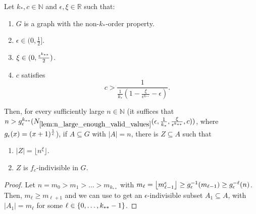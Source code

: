         \begin{lemma} \label{lem:many_values_to_equitative_partition_with_bound_exceptional_pairs}
            Let $k_*, c \in \mathbb{N}$ and $\epsilon, \xi \in \mathbb{R}$ such that:
            \begin{enumerate}
                \item\label{itm:many_values_to_equitative_partition_with_bound_exceptional_pairs.1} $G$ is a graph with the non-$k_*$-order property.
                \item\label{itm:many_values_to_equitative_partition_with_bound_exceptional_pairs.2} $\epsilon \in (0, \frac{1}{2}]$.
                \item\label{itm:many_values_to_equitative_partition_with_bound_exceptional_pairs.3} $\xi \in ( 0, \frac{\epsilon^{k_{**}}}{2} )$.
                \item\label{itm:many_values_to_equitative_partition_with_bound_exceptional_pairs.4} $c$ satisfies \[
                    c > \frac{1}{\frac{1}{k_*} (1 - \frac{\xi}{\epsilon^{k_{**}}} - \epsilon)}.
                \]
            \end{enumerate}
            Then, for every sufficiently large $n \in \mathbb{N}$ (it suffices that $n >
            g_\epsilon^{k_{**}}( N_{\ref{lem:n_large_enough_valid_values}}( \epsilon, \frac{1}{k_*}, \frac{\xi}{\epsilon^{k_{**}}}, c ) )$,
            where $g_\epsilon(x) = ( x+1 )^{\frac{1}{\epsilon}}$),
            if $A \subseteq G$ with $|A| = n$, there is $Z \subseteq A$ such that
            \begin{enumerate}[label=(\alph*), ref=\alph*]
                \item\label{itm:many_values_to_equitative_partition_with_bound_exceptional_pairs.a} $|Z| = \lfloor n^\xi \rfloor$.
                \item\label{itm:many_values_to_equitative_partition_with_bound_exceptional_pairs.b} $Z$ is $f_c$-indivisible in $G$.
            \end{enumerate}
            \begin{proof}
                Let $n = m_0 > m_1 > \dots > m_{k_{**}}$ with $m_\ell = \left\lfloor m_{\ell-1}^\epsilon \right\rfloor \geq g_\epsilon^{-1}(m_{\ell-1}) \geq g_\epsilon^{-\ell}(n)$.
                Then, $m_\ell \geq m_{\ell+1}$ and we can use 
                to get an $\epsilon$-indivisible subset $A_1 \subseteq A$, with $|A_1| = m_\ell$ for some $\ell \in \{ 0, \dots, k_{**}-1 \}$.

\end{proof}
\end{lemma}
